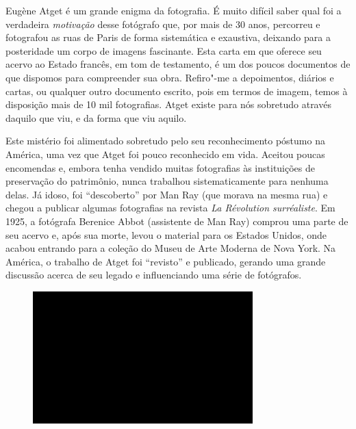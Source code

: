 Eugène Atget é um grande enigma da fotografia. É muito difícil saber
qual foi a verdadeira \emph{motivação} desse fotógrafo que, por mais de
30 anos, percorreu e fotografou as ruas de Paris de forma sistemática e
exaustiva, deixando para a posteridade um corpo de imagens fascinante.
Esta carta em que oferece seu acervo ao Estado francês, em tom de
testamento, é um dos poucos documentos de que dispomos para compreender
sua obra. Refiro"-me a depoimentos, diários e cartas, ou qualquer outro
documento escrito, pois em termos de imagem, temos à disposição mais de
10 mil fotografias. Atget existe para nós sobretudo através daquilo que
viu, e da forma que viu aquilo.

Este mistério foi alimentado sobretudo pelo seu reconhecimento póstumo
na América, uma vez que Atget foi pouco reconhecido em vida. Aceitou
poucas encomendas e, embora tenha vendido muitas fotografias às
instituições de preservação do patrimônio, nunca trabalhou
sistematicamente para nenhuma delas. Já idoso, foi ``descoberto'' por
Man Ray (que morava na mesma rua) e chegou a publicar algumas
fotografias na revista \emph{La Révolution surréaliste}. Em 1925, a
fotógrafa Berenice Abbot (assistente de Man Ray) comprou uma parte de
seu acervo e, após sua morte, levou o material para os Estados Unidos,
onde acabou entrando para a coleção do Museu de Arte Moderna de Nova
York. Na América, o trabalho de Atget foi ``revisto'' e publicado,
gerando uma grande discussão acerca de seu legado e influenciando uma
série de fotógrafos.

\begin{figure}[!ht]

\centering
 \includegraphics[width=85mm]{./imgs/im1.jpg}
\caption{\tiny{}}

\end{figure}

